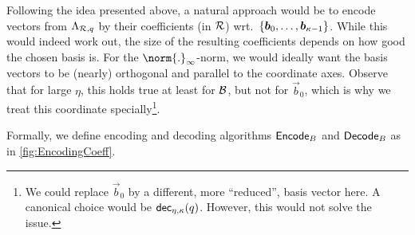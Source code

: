 Following the idea presented above, a natural approach would be to encode vectors from $\Lambda_{\mathcal{R},q}$ by their coefficients (in $\mathcal{R}$) wrt.\ $\{\boldsymbol{b}_0,\ldots,\boldsymbol{b}_{\kappa-1}\}$.
While this would indeed work out, the size of the resulting coefficients depends on how good the chosen basis is.
For the $\norm{.}_\infty$-norm, we would ideally want the basis vectors to be (nearly) orthogonal and parallel to the coordinate axes.
Observe that for large $\eta$, this holds true at least for $\mathcal{B}$, but not for $\vec{b}_0$, which is why we treat this coordinate specially\footnote{We could replace $\vec{b}_0$ by a different, more ``reduced'', basis vector here. A canonical choice would be $\mathsf{dec}_{\eta,\kappa}(q)$. However, this would not solve the issue.}.

Formally, we define encoding and decoding algorithms $\mathsf{Encode}_B$ and $\mathsf{Decode}_B$ as in \autoref{fig:EncodingCoeff}.




